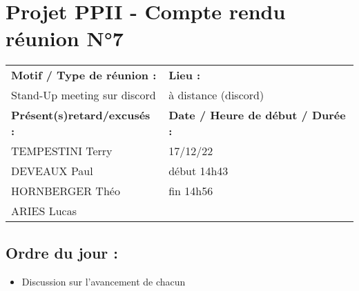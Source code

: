 \documentclass{article}
\begin{document}
\section*{Projet PPII - Compte rendu réunion N°7}
\begin{tabular}{|p{7cm}|p{6cm}|}
    \hline
    \textbf{Motif / Type de réunion :}
    & \textbf{Lieu :}
    \\
    Stand-Up meeting sur discord
    & 
    à distance (discord)
    \\ \hline
    \textbf{Présent(s)retard/excusés :}
    &
    \textbf{Date / Heure de début / Durée :}
    \\ 
    TEMPESTINI Terry &  17/12/22\\  
    DEVEAUX Paul & début 14h43\\
    HORNBERGER Théo & fin 14h56\\
    ARIES Lucas & 
    \\ \hline
\end{tabular}

\subsection*{Ordre du jour :}
\begin{itemize}
    \item{Discussion sur l'avancement de chacun}
\end{itemize}
\end{document}
